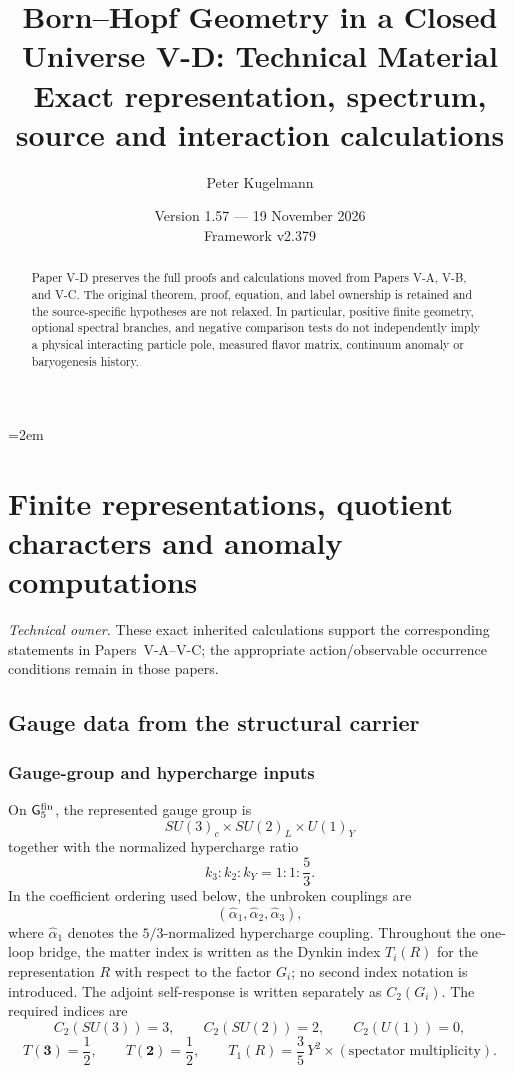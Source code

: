 \documentclass[11pt,a4paper]{article}
\title{\textbf{Born--Hopf Geometry in a Closed Universe V-D: Technical Material}\\[0.45em]
\large Exact representation, spectrum, source and interaction calculations}
\author{Peter Kugelmann}
\date{Version 1.57 --- 19 November 2026 \\ Framework v2.379}
\begin{document}
\emergencystretch=2em
\maketitle
\begin{abstract}
Paper V-D preserves the full proofs and calculations moved from Papers V-A, V-B, and V-C. The original theorem, proof, equation, and label ownership is retained and the source-specific hypotheses are not relaxed. In particular, positive finite geometry, optional spectral branches, and negative comparison tests do not independently imply a physical interacting particle pole, measured flavor matrix, continuum anomaly or baryogenesis history.
\end{abstract}
\tableofcontents
\clearpage

\section{Finite representations, quotient characters and anomaly computations}
\label{p5d:sec:A}
\noindent\textit{Technical owner.} These exact inherited calculations
support the corresponding statements in Papers~V-A--V-C;
the appropriate action/observable occurrence conditions remain in those papers.
\subsection{Gauge data from the structural carrier}
\label{p5:sec:part4-gauge-data}

\subsubsection{Gauge-group and hypercharge inputs}
On \(\mathsf G_5^{\rm fin}\), the represented gauge
group is
\[
SU(3)_c\times SU(2)_L\times U(1)_Y
\]
together with the normalized hypercharge ratio
\begin{equation}
\label{p5:eq:part4-hypercharge-normalization}
\boxed{k_3:k_2:k_Y=1:1:\frac53.}
\end{equation}
In the coefficient ordering used below, the unbroken couplings are
\[
(\hat\alpha_1,\hat\alpha_2,\hat\alpha_3),
\]
where $\hat\alpha_1$ denotes the $5/3$-normalized hypercharge coupling. Throughout the one-loop bridge, the matter index is written as the Dynkin index $T_i(R)$ for the representation $R$ with respect to the factor $G_i$; no second index notation is introduced. The adjoint self-response is written separately as $C_2(G_i)$. The required indices are
\begin{equation}
\label{p5:eq:part4-casimirs}
\boxed{C_2(SU(3))=3,\qquad C_2(SU(2))=2,\qquad C_2(U(1))=0,}
\end{equation}
\begin{equation}
\label{p5:eq:part4-fundamental-indices}
\boxed{T(\mathbf 3)=\frac12,\qquad T(\mathbf 2)=\frac12,\qquad T_1(R)=\frac35\,Y^2\times(\text{spectator multiplicity}).}
\end{equation}
\end{document}
